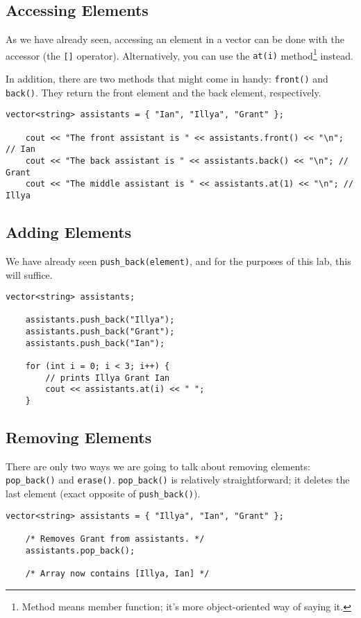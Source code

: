 \documentclass[12pt]{article}
\newcommand{\shellcmd}[1]{\texttt{\colorbox{gray!30}{#1}}}
\begin{document}
\subsection{Accessing Elements}
As we have already seen, accessing an element in a vector can be done with the accessor (the \texttt{[]} operator). Alternatively, you can use the \shellcmd{at(i)} method\footnote{Method means member function; it's more object-oriented way of saying it.} instead.

In addition, there are two methods that might come in handy: \shellcmd{front()} and \shellcmd{back()}. They return the front element and the back element, respectively.

\begin{lstlisting}[style=cC++]
    vector<string> assistants = { "Ian", "Illya", "Grant" };

	cout << "The front assistant is " << assistants.front() << "\n"; // Ian
	cout << "The back assistant is " << assistants.back() << "\n"; // Grant
	cout << "The middle assistant is " << assistants.at(1) << "\n"; // Illya
\end{lstlisting}

\subsection{Adding Elements}
We have already seen \shellcmd{push\_back(element)}, and for the purposes of this lab, this will suffice.

\begin{lstlisting}[style=cC++]
    vector<string> assistants;

	assistants.push_back("Illya");
	assistants.push_back("Grant");
	assistants.push_back("Ian");

	for (int i = 0; i < 3; i++) {
		// prints Illya Grant Ian
		cout << assistants.at(i) << " ";
	}
\end{lstlisting}
\subsection{Removing Elements}
There are only two ways we are going to talk about removing elements: \shellcmd{pop\_back()} and \shellcmd{erase()}. \shellcmd{pop\_back()} is relatively straightforward; it deletes the last element (exact opposite of \shellcmd{push\_back()}).

\begin{lstlisting}[style=cC++]
    vector<string> assistants = { "Illya", "Ian", "Grant" };

    /* Removes Grant from assistants. */
    assistants.pop_back();

    /* Array now contains [Illya, Ian] */
\end{lstlisting}
\end{document}
